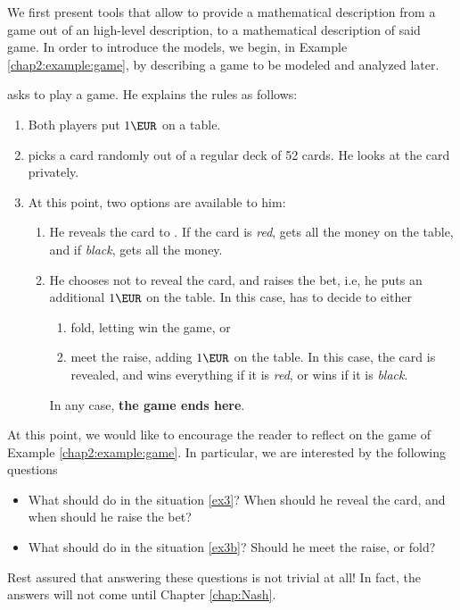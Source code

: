 We first present tools that allow to provide a mathematical description from a game out of an high-level description, to a mathematical description of said game.
In order to introduce the models, we begin, in Example \ref{chap2:example:game}, by describing a game to be modeled and analyzed later.
\begin{example}
\label{chap2:example:game}
\TAtwo{} asks \TAone{} to play a game. He explains the rules as follows:
\begin{enumerate}
\item Both players put $1\EUR$ on a table. \label{ex1}
\item \TAtwo{} picks a card randomly out of a regular deck of 52 cards. He looks at the card privately. \label{ex2}
\item At this point, two options are available to him: \label{ex3}
	\begin{enumerate}
	\item He reveals the card to \TAone{}. If the card is \emph{red}, \TAtwo{} gets all the money on the table, and if \emph{black}, \TAone{} gets all the money. \label{ex3a}
	\item He chooses not to reveal the card, and raises the bet, i.e, he puts an additional $1\EUR$ on the table. In this case, \TAone{} has to decide to either \label{ex3b}
	\begin{enumerate}
		\item fold, letting \TAtwo{} win the game, or \label{ex3b1}
		\item meet the raise, adding $1\EUR$ on the table. In this case, the card is revealed, and \TAtwo{} wins everything if it is \emph{red}, or \TAone{} wins if it is \emph{black}. \label{ex3b2}
	\end{enumerate}
	In any case, \textbf{the game ends here}.
	\end{enumerate}
\end{enumerate}
\end{example}
At this point, we would like to encourage the reader to reflect on the game of Example \ref{chap2:example:game}.
In particular, we are interested by the following questions
\begin{itemize}
	\item What should \TAtwo{} do in the situation \ref{ex3}? When should he reveal the card, and when should he raise the bet?
	\item What should \TAone{} do in the situation \ref{ex3b}? Should he meet the raise, or fold?
\end{itemize}
Rest assured that answering these questions is not trivial at all! In fact, the answers will not come until Chapter \ref{chap:Nash}.





